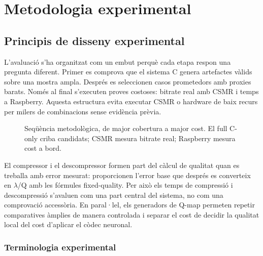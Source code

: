 \chapter{Metodologia experimental}\label{ch:metodologia}
\fancyhead[LO]{\slshape \textsf{\nouppercase \rightmark}}

\section{Principis de disseny experimental}\label{sec:principis_exp}

L'avaluació s'ha organitzat com un embut perquè cada etapa respon una pregunta
diferent. Primer es comprova que el sistema C genera artefactes vàlids sobre una
mostra ampla. Després es seleccionen casos prometedors amb proxies barats.
Només al final s'executen proves costoses: bitrate real amb CSMR i temps a
Raspberry. Aquesta estructura evita executar CSMR o hardware de baix recurs per
milers de combinacions sense evidència prèvia.

\begin{figure}[H]
\centering
{}
\caption{Seqüència metodològica, de major cobertura a major cost. El full
C-only criba candidats; CSMR mesura bitrate real; Raspberry mesura cost a bord.}
\label{fig:experiment_funnel}
\end{figure}

El compressor i el descompressor formen part del càlcul de qualitat quan es
treballa amb error mesurat: proporcionen l'error base que després es converteix
en $\lambda$/Q amb les fórmules fixed-quality. Per això els temps de compressió i
descompressió s'avaluen com una part central del sistema, no com una comprovació
accessòria. En paral·lel, els generadors de Q-map permeten repetir comparatives
àmplies de manera controlada i separar el cost de decidir la qualitat local del
cost d'aplicar el còdec neuronal.

\subsection{Terminologia experimental}

